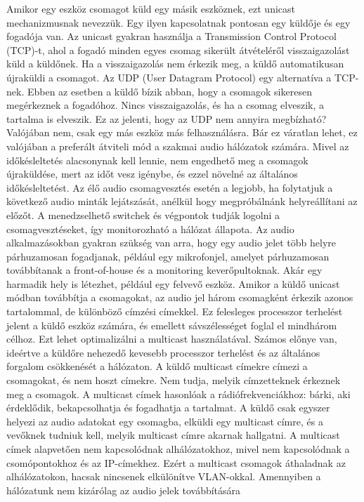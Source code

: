 Amikor egy eszköz csomagot küld egy másik eszköznek, ezt unicast mechanizmusnak
nevezzük. Egy ilyen kapcsolatnak pontosan egy küldője és egy fogadója van. Az
unicast gyakran használja a Transmission Control Protocol (TCP)-t, ahol a fogadó
minden egyes csomag sikerült átvételéről visszaigazolást küld a küldőnek. Ha a
visszaigazolás nem érkezik meg, a küldő automatikusan újraküldi a csomagot. 
Az UDP (User Datagram Protocol) egy alternatíva a TCP-nek. Ebben az esetben a küldő
bízik abban, hogy a csomagok sikeresen megérkeznek a fogadóhoz. Nincs
visszaigazolás, és ha a csomag elveszik, a tartalma is elveszik.
Ez az jelenti, hogy az UDP nem annyira megbízható? Valójában nem,
csak egy más eszköz más felhasználásra.
Bár ez váratlan lehet, ez valójában a preferált átviteli mód a szakmai audio hálózatok
számára. Mivel az időkésleltetés alacsonynak kell lennie, nem engedhető meg a
csomagok újraküldése, mert az időt vesz igénybe, és ezzel növelné az általános
időkésleltetést. Az élő audio csomagvesztés esetén a legjobb, ha folytatjuk a
következő audio minták lejátszását, anélkül hogy megpróbálnánk helyreállítani az
előzőt. A menedzselhető switchek és végpontok tudják logolni a csomagvesztéseket, így
monitorozható a hálózat állapota.
Az audio alkalmazásokban gyakran szükség van arra, hogy egy audio jelet
több helyre párhuzamosan fogadjanak, például egy mikrofonjel, amelyet
párhuzamosan továbbítanak a front-of-house és a monitoring keverőpultoknak. Akár
egy harmadik hely is létezhet, például egy felvevő eszköz. 
Amikor a küldő unicast módban továbbítja a csomagokat, az audio jel három csomagként
érkezik azonos tartalommal, de különböző címzési címekkel. Ez felesleges
processzor terhelést jelent a küldő eszköz számára, és emellett sávszélességet
foglal el mindhárom célhoz. Ezt lehet optimalizálni a multicast használatával. 
Számos előnye van, ideértve a küldőre nehezedő kevesebb processzor terhelést 
és az általános forgalom csökkenését a hálózaton. 
A küldő multicast címekre címezi a csomagokat, és nem hoszt címekre. Nem tudja, melyik
címzetteknek érkeznek meg a csomagok. A multicast címek hasonlóak a
rádiófrekvenciákhoz: bárki, aki érdeklődik, bekapcsolhatja és fogadhatja a
tartalmat. A küldő csak egyszer helyezi az audio adatokat egy csomagba, elküldi
egy multicast címre, és a vevőknek tudniuk kell, melyik multicast címre akarnak
hallgatni. A multicast címek alapvetően nem kapcsolódnak alhálózatokhoz, mivel nem
kapcsolódnak a csomópontokhoz és az IP-címekhez. Ezért a multicast csomagok
áthaladnak az alhálózatokon, hacsak nincsenek elkülönítve VLAN-okkal. 
Amennyiben a hálózatunk nem kizárólag az audio jelek továbbítására 
